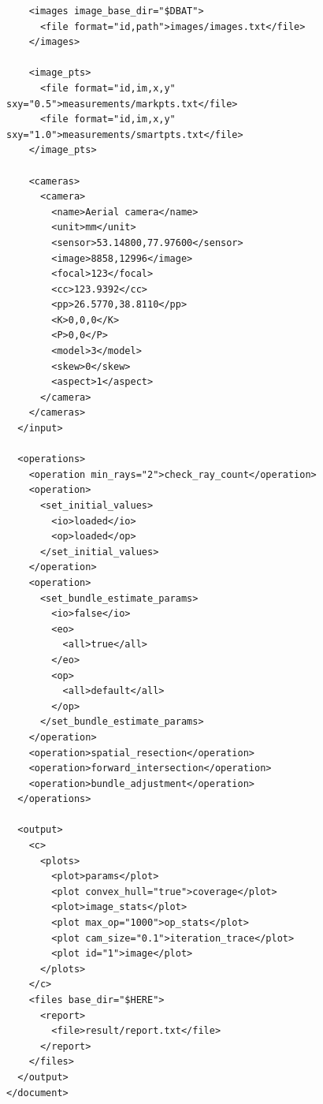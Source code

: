 \documentclass{article}
\begin{document}
\begin{verbatim}
    <images image_base_dir="$DBAT">
      <file format="id,path">images/images.txt</file>
    </images>

    <image_pts>
      <file format="id,im,x,y" sxy="0.5">measurements/markpts.txt</file>
      <file format="id,im,x,y" sxy="1.0">measurements/smartpts.txt</file>
    </image_pts>

    <cameras>
      <camera>
        <name>Aerial camera</name>
        <unit>mm</unit>
        <sensor>53.14800,77.97600</sensor>
        <image>8858,12996</image>
        <focal>123</focal>
        <cc>123.9392</cc>
        <pp>26.5770,38.8110</pp>
        <K>0,0,0</K>
        <P>0,0</P>
        <model>3</model>
        <skew>0</skew>
        <aspect>1</aspect>
      </camera>
    </cameras>
  </input>

  <operations>
    <operation min_rays="2">check_ray_count</operation>
    <operation>
      <set_initial_values>
        <io>loaded</io>
        <op>loaded</op>
      </set_initial_values>
    </operation>
    <operation>
      <set_bundle_estimate_params>
        <io>false</io>
        <eo>
          <all>true</all>
        </eo>
        <op>
          <all>default</all>
        </op>
      </set_bundle_estimate_params>
    </operation>
    <operation>spatial_resection</operation>
    <operation>forward_intersection</operation>
    <operation>bundle_adjustment</operation>
  </operations>

  <output>
    <c>
      <plots>
        <plot>params</plot>
        <plot convex_hull="true">coverage</plot>
        <plot>image_stats</plot>
        <plot max_op="1000">op_stats</plot>
        <plot cam_size="0.1">iteration_trace</plot>
        <plot id="1">image</plot>
      </plots>
    </c>
    <files base_dir="$HERE">
      <report>
        <file>result/report.txt</file>
      </report>
    </files>
  </output>
</document>
\end{verbatim}
\end{document}
